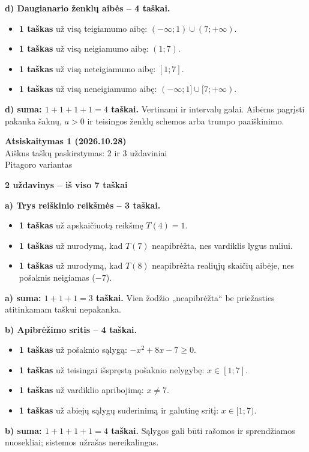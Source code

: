 \documentclass[11pt]{article}
\newcommand{\antraste}[1]{\begin{center}\Large\textbf{Atsiskaitymas 1 (2026.10.28)}\\\large #1\\\normalsize Pitagoro variantas\end{center}}
\newcommand{\sk}[1]{\par\medskip\textbf{#1}\par}
\begin{document}
\textbf{d) Daugianario ženklų aibės -- 4 taškai.}
\begin{itemize}
\item \textbf{1 taškas} už visą teigiamumo aibę:
$(-\infty;1)\cup(7;+\infty)$.
\item \textbf{1 taškas} už visą neigiamumo aibę: $(1;7)$.
\item \textbf{1 taškas} už visą neteigiamumo aibę: $[1;7]$.
\item \textbf{1 taškas} už visą neneigiamumo aibę:
$(-\infty;1]\cup[7;+\infty)$.
\end{itemize}
\textbf{d) suma: $1+1+1+1=4$ taškai.} Vertinami ir intervalų galai. Aibėms pagrįsti pakanka šaknų, $a>0$ ir teisingos ženklų schemos arba trumpo paaiškinimo.

\begin{center}\end{center}
\newpage
\antraste{Aiškus taškų paskirstymas: 2 ir 3 uždaviniai}
\sk{2 uždavinys -- iš viso 7 taškai}
\textbf{a) Trys reiškinio reikšmės -- 3 taškai.}
\begin{itemize}
\item \textbf{1 taškas} už apskaičiuotą reikšmę $T(4)=1$.
\item \textbf{1 taškas} už nurodymą, kad $T(7)$ neapibrėžta, nes vardiklis lygus nuliui.
\item \textbf{1 taškas} už nurodymą, kad $T(8)$ neapibrėžta realiųjų skaičių aibėje, nes pošaknis neigiamas ($-7$).
\end{itemize}
\textbf{a) suma: $1+1+1=3$ taškai.} Vien žodžio „neapibrėžta“ be priežasties atitinkamam taškui nepakanka.

\textbf{b) Apibrėžimo sritis -- 4 taškai.}
\begin{itemize}
\item \textbf{1 taškas} už pošaknio sąlygą:
$-x^2+8x-7\ge0$.
\item \textbf{1 taškas} už teisingai išspręstą pošaknio nelygybę:
$x\in[1;7]$.
\item \textbf{1 taškas} už vardiklio apribojimą: $x\ne7$.
\item \textbf{1 taškas} už abiejų sąlygų suderinimą ir galutinę sritį:
$x\in[1;7)$.
\end{itemize}
\textbf{b) suma: $1+1+1+1=4$ taškai.} Sąlygos gali būti rašomos ir sprendžiamos nuosekliai; sistemos užrašas nereikalingas.
\end{document}
